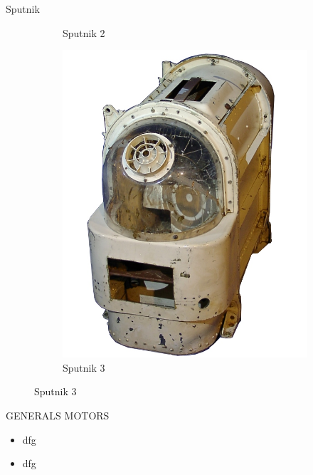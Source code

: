 \begin{frame}[fragile]{Sputnik}
\begin{figure}
\begin{subfigure}{0.33\textwidth}
			\caption{Sputnik 2}
		\end{subfigure}
		\pause
		\begin{subfigure}{0.32\textwidth}
			\centering
			\includegraphics[scale=0.4]{./EtapaPrimeriza/imagenes/s10.jpg}
			\caption{Sputnik 3}
		\end{subfigure}
	\end{figure}
\end{frame}


\begin{frame}[fragile]{GENERALS MOTORS}
\vspace{10px}
\pause
{}
\begin{block}{}
	\begin{itemize}
		\item dfg
		\pause
		\item dfg
	\end{itemize}
\end{block}
\end{frame}
